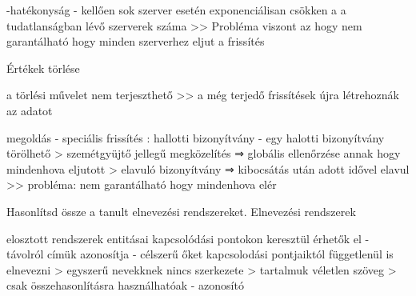 \documentclass[twoside, a4paper, 12pt]{article}
\begin{document}
\begin{description}
                                                                        -hatékonyság
                                                                        - kellően sok szerver esetén exponenciálisan csökken a a tudatlanságban lévő szerverek száma
                                                                        >> Probléma viszont az hogy nem garantálható hogy minden szerverhez eljut a frissítés 
                                                                    \item Értékek törlése
                                                                    \item a törlési művelet nem terjeszthető
                                                                        >> a még terjedő frissítések újra létrehoznák az adatot
                                                                    \item megoldás
                                                                        - speciális frissítés : hallotti bizonyítvány
                                                                        - egy halotti bizonyítvány törölhető
                                                                        > szemétgyüjtő jellegű megközelítés ⇒ globális ellenőrzése annak hogy mindenhova eljutott
                                                                        > elavuló bizonyítvány ⇒ kibocsátás után adott idővel elavul >> probléma: nem garantálható hogy mindenhova elér
                                                                    \item  Hasonlítsd össze a tanult elnevezési rendszereket.
                                                                        Elnevezési rendszerek
                                                                    \item elosztott rendszerek entitásai kapcsolódási pontokon keresztül érhetők el
                                                                        - távolról címük azonosítja
                                                                        - célszerű őket kapcsolodási pontjaiktól függetlenül is elnevezni
                                                                        > egyszerű nevekknek nincs szerkezete
                                                                        > tartalmuk véletlen szöveg
                                                                        > csak összehasonlításra használhatóak
                                                                        - azonosító

\end{description}
\end{document}
